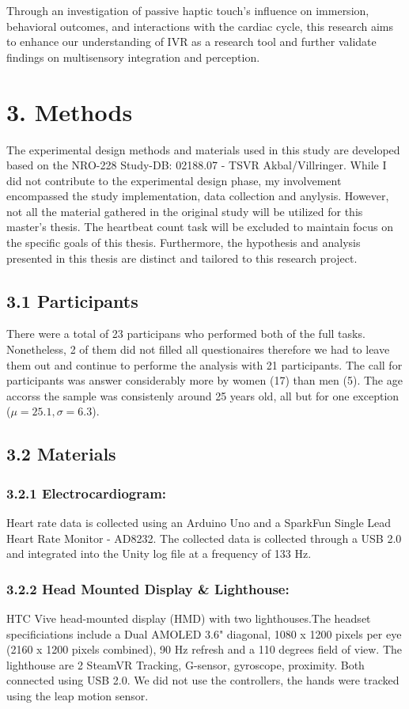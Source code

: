 \documentclass[12pt,oneside,openright]{report}
\begin{document}
Through an investigation of passive haptic touch's influence on immersion, behavioral outcomes, and interactions with the cardiac cycle, this research aims to enhance our understanding of IVR as a research tool and further validate findings on multisensory integration and perception.  

\section*{3. Methods}

The experimental design methods and materials used in this study are developed based on the NRO-228 Study-DB: 02188.07 - TSVR Akbal/Villringer. While I did not contribute to the experimental design phase, my involvement encompassed the study implementation, data collection and anylysis.  However, not all the material gathered in the original study will be utilized for this master's thesis. The heartbeat count task will be excluded to maintain focus on the specific goals of this thesis. Furthermore, the hypothesis and analysis presented in this thesis are distinct and tailored to this research project.

\subsection*{3.1 Participants}

There were a total of 23 participans who performed both of the full tasks. Nonetheless, 2 of them did not filled all questionaires therefore we had to leave them out and continue to performe the analysis with 21 participants. The call for participants was answer considerably more by women (17) than men (5). The age accorss the sample was consistenly around 25 years old, all but for one exception ($\mu=25.1 , \sigma=6.3$).

\subsection*{3.2 Materials}


\subsubsection*{3.2.1 Electrocardiogram:} Heart rate data is collected using an Arduino Uno and a SparkFun Single Lead Heart Rate Monitor - AD8232. The collected data is collected through a USB 2.0 and integrated into the Unity log file at a frequency of 133 Hz.
\subsubsection*{3.2.2 Head Mounted Display \& Lighthouse:} HTC Vive head-mounted display (HMD) with  two lighthouses.The headset specificiations include a Dual AMOLED 3.6" diagonal, 	1080 x 1200 pixels per eye (2160 x 1200 pixels combined), 90 Hz refresh and a 110 degrees field of view.  The lighthouse are 2 SteamVR Tracking, G-sensor, gyroscope, proximity. Both connected using  USB 2.0. We did not use the controllers, the hands were tracked using the leap motion sensor. 
\end{document}

